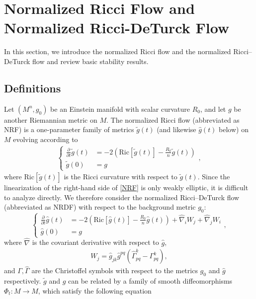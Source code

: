 \documentclass[12pt]{amsart}
\begin{document}
\section{Normalized Ricci Flow and Normalized Ricci-DeTurck Flow}\label{sec: ricci_flow}

In this section, we introduce the normalized Ricci flow and the normalized Ricci--DeTurck flow and review basic stability results.
\subsection{Definitions}
Let $(M^n, g_0)$ be an Einstein manifold with scalar curvature $R_0$, and let $g$ be another Riemannian metric on $M$. The normalized Ricci flow (abbreviated as NRF) is a one-parameter family of metrics $\tilde g(t)$ (and likewise $\hat g(t)$ below) on $M$ evolving according to
\begin{align}\label{NRF}
    \left\{
        \begin{aligned} 
            \frac{\partial}{\partial t} \tilde{g}(t) & =-2\left(\mathrm{Ric}[\tilde{g}(t)] - \frac{R_0}{n} \tilde{g}(t)\right) \\ 
            \tilde{g}(0) &=g
        \end{aligned}
    \right.,
\end{align}
where $\mathrm{Ric}[\tilde{g}(t)]$ is the Ricci curvature with respect to $\tilde{g}(t)$. Since the linearization of the right-hand side of \eqref{NRF} is only weakly elliptic, it is difficult to analyze directly. We therefore consider the normalized Ricci--DeTurck flow (abbreviated as NRDF) with respect to the background metric $g_0$:
\begin{equation}\label{NRDF}
    \left\{
        \begin{aligned}
            \frac{\partial}{\partial t} \hat{g}(t) &= -2\left(\mathrm{Ric}[\hat{g}(t)] - \frac{R_0}{n} \hat{g}(t) \right)+\hat{\nabla}_i W_j+\hat{\nabla}_j W_i  \\
            \hat{g}(0) &= g
        \end{aligned}
    \right.,
\end{equation}
where $\hat{\nabla}$ is the covariant derivative with respect to $\hat{g}$, 
\begin{align}
    W_j = \hat{g}_{j k} \hat{g}^{p q} \left( \hat{\Gamma}_{pq}^k - \Gamma_{pq}^k \right),
\end{align}
and $\Gamma, \hat{\Gamma}$ are the Christoffel symbols with respect to the metrics $g_0$ and $\hat{g}$ respectively. $\tilde{g}$ and $\hat{g}$ can be related by a family of smooth diffeomorphisms $\Phi_t: M\rightarrow M$, which satisfy the following equation
\end{document}

